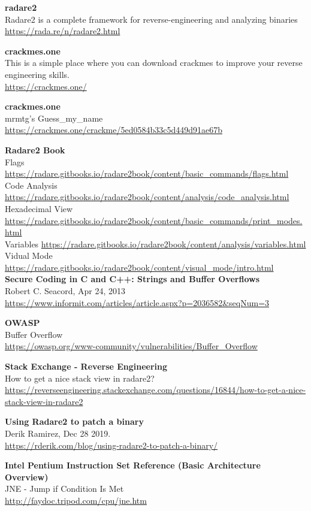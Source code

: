 \documentclass[10pt,a4paper]{article}
\begin{document}
\begin{thebibliography}{9}

	\textbf{radare2}\\
	Radare2 is a complete framework for reverse-engineering and analyzing binaries\\
	\url{https://rada.re/n/radare2.html}

	\textbf{crackmes.one}\\
	This is a simple place where you can download crackmes to improve your reverse engineering skills.\\
	\url{https://crackmes.one/}

	\textbf{crackmes.one}\\
	mrmtg's Guess\_my\_name\\
	\url{https://crackmes.one/crackme/5ed0584b33c5d449d91ae67b}
	
	\textbf{Radare2 Book}\\
	Flags \url{https://radare.gitbooks.io/radare2book/content/basic_commands/flags.html}\\
	Code Analysis \url{https://radare.gitbooks.io/radare2book/content/analysis/code_analysis.html}\\
	Hexadecimal View \url{https://radare.gitbooks.io/radare2book/content/basic_commands/print_modes.html}\\
	Variables \url{https://radare.gitbooks.io/radare2book/content/analysis/variables.html}\\
	Vidual Mode \url{https://radare.gitbooks.io/radare2book/content/visual_mode/intro.html}\\
	
	\textbf{Secure Coding in C and C++: Strings and Buffer Overflows}\\
	Robert C. Seacord, Apr 24, 2013\\
	\url{https://www.informit.com/articles/article.aspx?p=2036582&seqNum=3}
	
	\textbf{OWASP}\\
	Buffer Overflow\\
	\url{https://owasp.org/www-community/vulnerabilities/Buffer_Overflow}

	\textbf{Stack Exchange - Reverse Engineering}\\
	How to get a nice stack view in radare2?\\
	\url{https://reverseengineering.stackexchange.com/questions/16844/how-to-get-a-nice-stack-view-in-radare2}
	
	\textbf{Using Radare2 to patch a binary}\\
	Derik Ramirez, Dec 28 2019.\\
	\url{https://rderik.com/blog/using-radare2-to-patch-a-binary/}

	\textbf{Intel Pentium Instruction Set Reference (Basic Architecture Overview)}\\
	JNE - Jump if Condition Is Met\\
	\url{http://faydoc.tripod.com/cpu/jne.htm}

\end{thebibliography}
\end{document}
